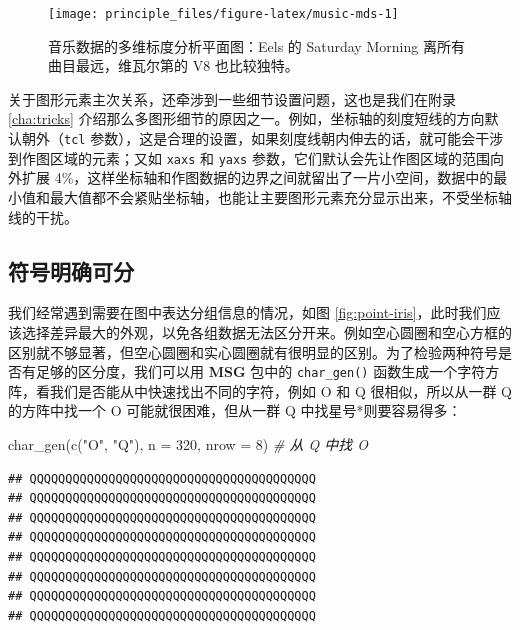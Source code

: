 \documentclass[
  b5paper,
  UTF8,twoside]{book}
\newenvironment{Shaded}{\begin{snugshade}}{\end{snugshade}}
\newcommand{\AttributeTok}[1]{\textcolor[rgb]{0.77,0.63,0.00}{#1}}
\newcommand{\CommentTok}[1]{\textcolor[rgb]{0.56,0.35,0.01}{\textit{#1}}}
\newcommand{\DecValTok}[1]{\textcolor[rgb]{0.00,0.00,0.81}{#1}}
\newcommand{\FunctionTok}[1]{\textcolor[rgb]{0.00,0.00,0.00}{#1}}
\newcommand{\NormalTok}[1]{#1}
\newcommand{\StringTok}[1]{\textcolor[rgb]{0.31,0.60,0.02}{#1}}
\begin{document}
\begin{figure}

{\centering \texttt{[image: principle\_files/figure-latex/music-mds-1]} 

}

\caption[ 音乐数据的多维标度分析平面图 ]{音乐数据的多维标度分析平面图：Eels 的 Saturday Morning 离所有曲目最远，维瓦尔第的 V8 也比较独特。}\label{fig:music-mds}
\end{figure}



关于图形元素主次关系，还牵涉到一些细节设置问题，这也是我们在附录 \ref{cha:tricks} 介绍那么多图形细节的原因之一。例如，坐标轴的刻度短线的方向默认朝外（\texttt{tcl} 参数），这是合理的设置，如果刻度线朝内伸去的话，就可能会干涉到作图区域的元素；又如 \texttt{xaxs} 和 \texttt{yaxs} 参数，它们默认会先让作图区域的范围向外扩展 4\%，这样坐标轴和作图数据的边界之间就留出了一片小空间，数据中的最小值和最大值都不会紧贴坐标轴，也能让主要图形元素充分显示出来，不受坐标轴线的干扰。

\hypertarget{subsec:clear-symbols}{%
\subsection{符号明确可分}\label{subsec:clear-symbols}}

我们经常遇到需要在图中表达分组信息的情况，如图 \ref{fig:point-iris}，此时我们应该选择差异最大的外观，以免各组数据无法区分开来。例如空心圆圈和空心方框的区别就不够显著，但空心圆圈和实心圆圈就有很明显的区别。为了检验两种符号是否有足够的区分度，我们可以用 \textbf{MSG} 包中的 \texttt{char\_gen()} 函数生成一个字符方阵，看我们是否能从中快速找出不同的字符，例如 O 和 Q 很相似，所以从一群 Q 的方阵中找一个 O 可能就很困难，但从一群 Q 中找星号*则要容易得多：

\begin{Shaded}
\begin{Highlighting}[]
\FunctionTok{char\_gen}\NormalTok{(}\FunctionTok{c}\NormalTok{(}\StringTok{"O"}\NormalTok{, }\StringTok{"Q"}\NormalTok{), }\AttributeTok{n =} \DecValTok{320}\NormalTok{, }\AttributeTok{nrow =} \DecValTok{8}\NormalTok{) }\CommentTok{\# 从 Q 中找 O}
\end{Highlighting}
\end{Shaded}

\begin{verbatim}
## QQQQQQQQQQQQQQQQQQQQQOQQQQQQQQQQQQQQQQQQ
## QQQQQQQQQQQQQQQQQQQQQQQQQQQQQQQQQQQQQQQQ
## QQQQQQQQQQQQQQQQQQQQQQQQQQQQQQQQQQQQQQQQ
## QQQQQQQQQQQQQQQQQQQQQQQQQQQQQQQQQQQQQQQQ
## QQQQQQQQQQQQQQQQQQQQQQQQQQQQQQQQQQQQQQQQ
## QQQQQQQQQQQQQQQQQQQQQQQQQQQQQQQQQQQQQQQQ
## QQQQQQQQQQQQQQQQQQQQQQQQQQQQQQQQQQQQQQQQ
## QQQQQQQQQQQQQQQQQQQQQQQQQQQQQQQQQQQQQQQQ
\end{verbatim}
\end{document}
